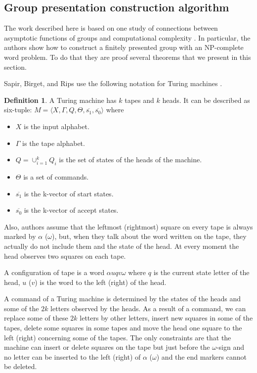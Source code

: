 \documentclass[conference]{IEEEtran}
\theoremstyle{definition}
\newtheorem{defn}{Definition}[section]
\begin{document}
\subsection{Group presentation construction algorithm}

The work described here is based on one study of connections 
between asymptotic functions of groups and computational complexity \cite{Sapir}. 
In particular, the authors show how to construct a finitely presented group
with an NP-complete word problem. To do that they are proof several theorems 
that we present in this section.

Sapir, Birget, and Rips use the following notation for Turing machines \cite{Sapir}.
\begin{defn}
A Turing machine has $k$ tapes and $k$ heads. It can be described as six-tuple:
$M = \langle X, \Gamma, Q, \Theta, \overline{s_1}, \overline{s_0} \rangle$
where
\begin{itemize}
    \item $X$ is the input alphabet.
    \item $\Gamma$ is the tape alphabet.
    \item $Q = \cup_{i=1}^k Q_i$ is the set of states of the heads of the machine.
    \item $\Theta$ is a set of commands.
    \item $\overline{s_1}$ is the k-vector of start states.
    \item $\overline{s_0}$ is the k-vector of accept states. 
\end{itemize}
\end{defn}


Also, authors assume that the leftmost (rightmost) square on every tape is always marked by 
$\alpha$ ($\omega$), but, when they talk about the word written on the tape, 
they actually do not include them and the state of the head. At every moment the head 
observes two squares on each tape.

A configuration of tape is a word $\alpha u q v \omega$ where $q$ is the current
state letter of the head, $u$ ($v$) is the word to the left (right) of the head. 

A command of a Turing machine is determined by the states of the heads and some of the 
$2k$ letters observed by the heads. 
As a result of a command, we can replace some of these $2k$ letters by other letters, 
insert new squares in some of the tapes, delete some squares in some tapes and move 
the head one square to the left (right) concerning some of the tapes. 
The only constraints are that the machine can insert or delete squares on the tape 
but just before the $\omega$-sign and no letter can be inserted to the left (right) 
of $\alpha$ ($\omega$) and the end markers cannot be deleted.
\end{document}

